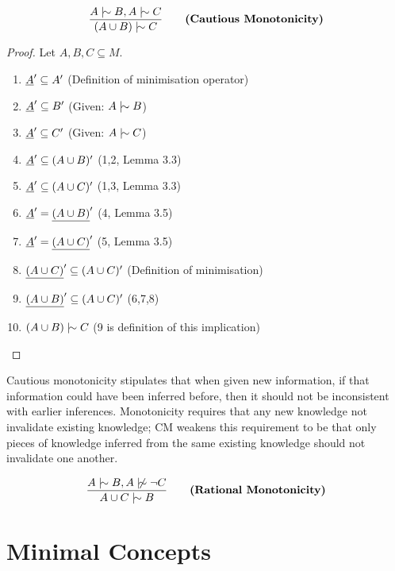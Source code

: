 \documentclass[11pt]{article}
\begin{document}

\begin{equation}
  \frac{A \twiddle B, A \twiddle C}{(A \cup B) \twiddle C} \qquad \textbf{(Cautious Monotonicity)}
\end{equation}

\begin{proof}
  Let $A, B, C \subseteq M$.
  \begin{enumerate}
    \item $\underline{A}' \subseteq A'$ \hfill (Definition of minimisation operator)
    \item $\underline{A}' \subseteq B'$ \hfill (Given: $A \twiddle B$)
    \item $\underline{A}' \subseteq C'$ \hfill (Given: $A \twiddle C$)
    \item $\underline{A}' \subseteq (A \cup B)' $ \hfill (1,2, Lemma 3.3)
    \item $\underline{A}' \subseteq (A \cup C)' $ \hfill (1,3, Lemma 3.3)
    \item $\underline{A}' = \underline{(A\cup B)}'$ \hfill (4, Lemma 3.5)
    \item $\underline{A}' = \underline{(A \cup C)}'$ \hfill (5, Lemma 3.5)
    \item $\underline{(A\cup C)}' \subseteq (A \cup C)'$ \hfill (Definition of minimisation)
    \item $\underline{(A\cup B)}' \subseteq (A\cup C)'$ \hfill (6,7,8)
    \item $(A\cup B) \twiddle C$ \hfill (9 is definition of this implication)
  \end{enumerate}
\end{proof}

\begin{remark}
  Cautious monotonicity stipulates that when given new information, if that information could have been inferred before, then it should not be inconsistent with earlier inferences. Monotonicity requires that any new knowledge not invalidate existing knowledge; CM weakens this requirement to be that only pieces of knowledge inferred from the same existing knowledge should not invalidate one another.
\end{remark}

\begin{equation}
  \frac{A \twiddle B, A \ntwiddle \neg C}{A \cup C \twiddle B} \qquad \textbf{(Rational Monotonicity)}
\end{equation}

\clearpage
\section{Minimal Concepts}
\end{document}
